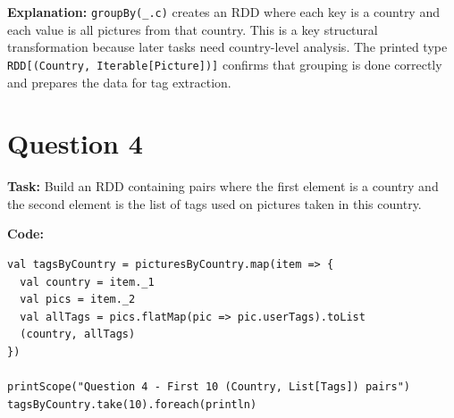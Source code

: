 \documentclass[11pt]{article}
\begin{document}
\textbf{Explanation:} \texttt{groupBy(_.c)} creates an RDD where each key is a country and each value is all pictures from that country. This is a key structural transformation because later tasks need country-level analysis. The printed type \texttt{RDD[(Country, Iterable[Picture])]} confirms that grouping is done correctly and prepares the data for tag extraction.

\section*{Question 4}
\textbf{Task:} Build an RDD containing pairs where the first element is a country and the second element is the list of tags used on pictures taken in this country.

\textbf{Code:}
\begin{lstlisting}
val tagsByCountry = picturesByCountry.map(item => {
  val country = item._1
  val pics = item._2
  val allTags = pics.flatMap(pic => pic.userTags).toList
  (country, allTags)
})

printScope("Question 4 - First 10 (Country, List[Tags]) pairs")
tagsByCountry.take(10).foreach(println)
\end{lstlisting}
\end{document}
